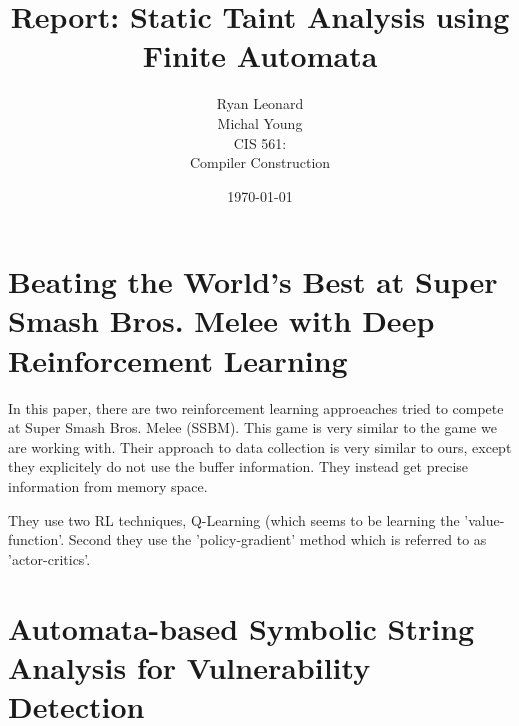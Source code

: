\documentclass[12pt]{article}
\title{Report: Static Taint Analysis using Finite Automata}
\author{
        Ryan Leonard \\
        Michal Young \\
        CIS 561: \\
        Compiler Construction
}
\date{\today}
\begin{document}
\newcommand{\authgould}{ Gould et. al }
\newcommand{\authchris}{ Christensen et. al }
\newcommand{\authyu}{ Yu et. al }
\maketitle

\nocite{gould04}
\nocite{chris03}
\nocite{yu14}

\section{Beating the World's Best at Super Smash Bros. Melee with Deep Reinforcement Learning}

In this paper, there are two reinforcement learning approeaches tried to compete at Super Smash Bros. Melee (SSBM).
This game is very similar to the game we are working with.
Their approach to data collection is very similar to ours, except they explicitely do not use the buffer information.
They instead get precise information from memory space.

They use two RL techniques, Q-Learning (which seems to be learning the 'value-function'.
Second they use the 'policy-gradient' method which is referred to as 'actor-critics'.

\section{Automata-based Symbolic String Analysis for Vulnerability Detection}



\end{document}
